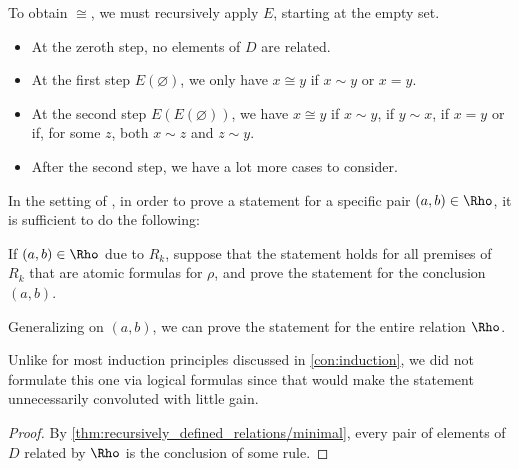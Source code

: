 \begin{example}
  To obtain \( {\cong} \), we must recursively apply \( E \), starting at the empty set.
  \begin{itemize}
    \item At the zeroth step, no elements of \( D \) are related.
    \item At the first step \( E(\varnothing) \), we only have \( x \cong y \) if \( x \sim y \) or \( x = y \).
    \item At the second step \( E(E(\varnothing)) \), we have \( x \cong y \) if \( x \sim y \), if \( y \sim x \), if \( x = y \) or if, for some \( z \), both \( x \sim z \) and \( z \sim y \).
    \item After the second step, we have a lot more cases to consider.
  \end{itemize}
\end{example}

\begin{theorem}\label{thm:induction_on_recursively_defined_relations}
  In the setting of , in order to prove a statement for a specific pair \( (a, b) \in \Rho \), it is sufficient to do the following:
  \begin{displayquote}
    If \( (a, b) \in \Rho \) due to \( R_k \), suppose that the statement holds for all premises of \( R_k \) that are atomic formulas for \( \rho \), and prove the statement for the conclusion \( (a, b) \).
  \end{displayquote}

  Generalizing on \( (a, b) \), we can prove the statement for the entire relation \( \Rho \).
\end{theorem}
\begin{comments}
  \item Unlike for most induction principles discussed in \cref{con:induction}, we did not formulate this one via logical formulas since that would make the statement unnecessarily convoluted with little gain.
\end{comments}
\begin{proof}
  By \cref{thm:recursively_defined_relations/minimal}, every pair of elements of \( D \) related by \( \Rho \) is the conclusion of some rule.
\end{proof}
